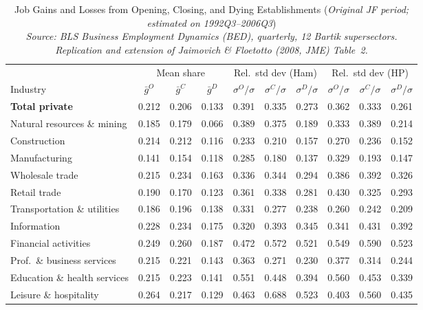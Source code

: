 \begin{table}[htbp]
\centering
\small
\caption{Job Gains and Losses from Opening, Closing, and Dying Establishments (\emph{Original JF period; estimated on 1992Q3--2006Q3}) \\[2pt]
  {\small\itshape Source: BLS Business Employment Dynamics (BED), quarterly, 12 Bartik supersectors. Replication and extension of Jaimovich \& Floetotto (2008, JME) Table~2.}}
\label{tab:jf_t2_jf_orig}
\begin{tabular}{lccccccccc}
\toprule
 & \multicolumn{3}{c}{Mean share} & \multicolumn{3}{c}{Rel.\ std dev (Ham)} & \multicolumn{3}{c}{Rel.\ std dev (HP)} \\
\cmidrule(lr){2-4}\cmidrule(lr){5-7}\cmidrule(lr){8-10}
Industry & $\bar{g}^O$ & $\bar{g}^C$ & $\bar{g}^D$ & $\sigma^O/\sigma$ & $\sigma^C/\sigma$ & $\sigma^D/\sigma$ & $\sigma^O/\sigma$ & $\sigma^C/\sigma$ & $\sigma^D/\sigma$ \\
\midrule
\midrule
\textbf{Total private} & 0.212 & 0.206 & 0.133 & 0.391 & 0.335 & 0.273 & 0.362 & 0.333 & 0.261 \\
Natural resources \& mining & 0.185 & 0.179 & 0.066 & 0.389 & 0.375 & 0.189 & 0.333 & 0.389 & 0.214 \\
Construction & 0.214 & 0.212 & 0.116 & 0.233 & 0.210 & 0.157 & 0.270 & 0.236 & 0.152 \\
Manufacturing & 0.141 & 0.154 & 0.118 & 0.285 & 0.180 & 0.137 & 0.329 & 0.193 & 0.147 \\
Wholesale trade & 0.215 & 0.234 & 0.163 & 0.336 & 0.344 & 0.294 & 0.386 & 0.392 & 0.326 \\
Retail trade & 0.190 & 0.170 & 0.123 & 0.361 & 0.338 & 0.281 & 0.430 & 0.325 & 0.293 \\
Transportation \& utilities & 0.186 & 0.196 & 0.138 & 0.331 & 0.277 & 0.238 & 0.260 & 0.242 & 0.209 \\
Information & 0.228 & 0.234 & 0.175 & 0.320 & 0.393 & 0.345 & 0.341 & 0.431 & 0.392 \\
Financial activities & 0.249 & 0.260 & 0.187 & 0.472 & 0.572 & 0.521 & 0.549 & 0.590 & 0.523 \\
Prof.~\& business services & 0.215 & 0.221 & 0.143 & 0.363 & 0.271 & 0.230 & 0.377 & 0.314 & 0.244 \\
Education \& health services & 0.215 & 0.223 & 0.141 & 0.551 & 0.448 & 0.394 & 0.560 & 0.453 & 0.339 \\
Leisure \& hospitality & 0.264 & 0.217 & 0.129 & 0.463 & 0.688 & 0.523 & 0.403 & 0.560 & 0.435 \\

\end{tabular}
\end{table}
